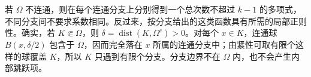 \begin{solution}
若 \(\Omega\) 不连通，则在每个连通分支上分别得到一个总次数不超过 \(k-1\) 的多项式，不同分支间不要求系数相同。反过来，按分支给出的这类函数具有所需的局部正则性。确实，若 \(K\Subset\Omega\)，则 \(\delta=\operatorname{dist}(K,\Omega^c)>0\)。对每个 \(x\in K\)，连通球 \(B(x,\delta/2)\) 包含于 \(\Omega\)，因而完全落在 \(x\) 所属的连通分支中；由紧性可取有限个这样的球覆盖 \(K\)，所以 \(K\) 只遇到有限个分支。分支边界不在 \(\Omega\) 内，也不会产生内部跳跃项。
\end{solution}

